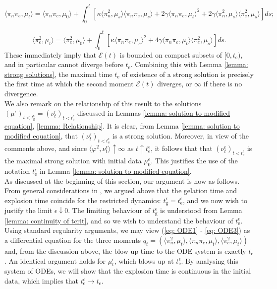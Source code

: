 \begin{equation}\label{eq: ODE2}
    \langle \pi_n \pi_e, \mu_t\rangle =
    \langle \pi_n\pi_e, \mu_0\rangle + \int_0^t \left[\kappa\langle \pi_n^2, \mu_s\rangle\langle \pi_n\pi_e, \mu_s\rangle+2\gamma\langle \pi_n\pi_e, \mu_t\rangle^2+2\gamma\langle\pi_n^2, \mu_s\rangle\langle \pi_e^2, \mu_s \rangle \right] ds;
\end{equation}

\begin{equation} \label{eq: ODE3}
    \langle \pi_e^2, \mu_t\rangle =
    \langle \pi_e^2, \mu_0\rangle + \int_0^t \left[\kappa\langle \pi_n\pi_e, \mu_s\rangle^2+4\gamma\langle \pi_n\pi_e, \mu_t\rangle\langle\pi_e^2, \mu_s \rangle \right] ds.
\end{equation} These immediately imply that $\mathcal{E}(t)$ is bounded on compact subsets of $[0, t_\mathrm{e})$, and in particular cannot diverge before $t_\mathrm{e}$. Combining this with Lemma \ref{lemma: strong solutions}, the maximal time $t_\mathrm{e}$ of existence of a strong solution is precisely the first time at which the second moment $\mathcal{E}(t)$ diverges, or $\infty$ if there is no divergence. \medskip \\ We also remark on the relationship of this result to the solutions $(\mu^\epsilon)_{t<t_\mathrm{g}^\epsilon}=(\nu^\epsilon_t)_{t<t_\mathrm{e}^\epsilon}$ discussed in Lemmas \ref{lemma: solution to modified equation}, \ref{lemma: Relationship}. It is clear, from Lemma \ref{lemma: solution to modified equation}, that $(\nu^\epsilon_t)_{t<t_\mathrm{e}^\epsilon}$ is a strong solution. Moreover, in view of the comments above, and since $\langle \varphi^2, \nu^\epsilon_t\rangle \uparrow \infty$ as $t\uparrow t_\mathrm{e}^\epsilon$, it follows that that $(\nu^{\epsilon}_t)_{t<t_\mathrm{e}^\epsilon}$ is the maximal strong solution with initial data $\mu^\epsilon_0.$ This justifies the use of the notation $t^\epsilon_\mathrm{e}$ in Lemma \ref{lemma: solution to modified equation}. \bigskip \\  As discussed at the beginning of this section, our argument is now as follows. From general considerations in \cite{N00}, we argued above that the gelation time and explosion time coincide for the restricted dynamics: $t_\mathrm{g}^\epsilon=t_\mathrm{e}^\epsilon$, and we now wish to justify the limit $\epsilon\downarrow 0$. The limiting behaviour of $t^\epsilon_\mathrm{g}$ is understood from Lemma \ref{lemma: continuity of tcrit}, and so we wish to understand the behaviour of $t_\mathrm{e}^\epsilon.$ \medskip \\  Using standard regularity arguments, we may view (\ref{eq: ODE1} - \ref{eq: ODE3}) as a differential equation for the three moments $q_t=(\langle \pi_n^2, \mu_t\rangle, \langle \pi_n \pi_e, \mu_t\rangle, \langle \pi_e^2, \mu_t\rangle)$ and, from the discussion above, the blow-up time to the ODE system is exactly $t_\mathrm{e}$. An identical argument holds for $\mu^\epsilon_t$, which blows up at $t^\epsilon_\mathrm{e}$. By analysing this system of ODEs, we will show that the explosion time is continuous in the initial data, which implies that $t^\epsilon_\mathrm{e}\rightarrow t_\mathrm{e}.$
